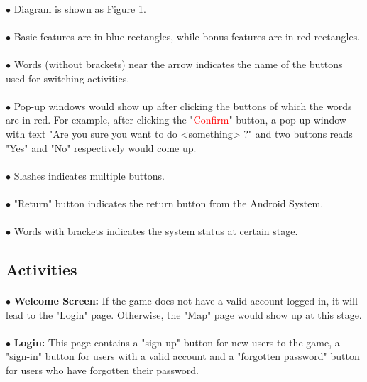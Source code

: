 \documentclass[paper=a4, fontsize=11pt]{scrartcl} %
\begin{document}
\paragraph{} $\bullet$ Diagram is shown as Figure 1.
\paragraph{} $\bullet$ Basic features are in blue rectangles, while bonus features are in red rectangles.
\paragraph{} $\bullet$ Words (without brackets) near the arrow indicates the name of the buttons used for switching activities.
\paragraph{} $\bullet$ Pop-up windows would show up after clicking the buttons of which the words are in red. For example, after clicking the "\textcolor{red}{Confirm}" button, a pop-up window with text "Are you sure you want to do <something> ?" and two buttons reads "Yes" and "No" respectively would come up. 
\paragraph{} $\bullet$ Slashes indicates multiple buttons.
\paragraph{} $\bullet$ "Return" button indicates the return button from the Android System.
\paragraph{} $\bullet$ Words with brackets indicates the system status at certain stage.


\subsection{Activities}
\paragraph{}$\bullet$ \textbf{Welcome Screen: } If the game does not have a valid account logged in, it will lead to the "Login" page. Otherwise, the "Map" page would show up at this stage.
\paragraph{}$\bullet$ \textbf{Login: } This page contains a "sign-up" button for new users to the game, a "sign-in" button for users with a valid account and a "forgotten password" button for users who have forgotten their password.
\end{document}
